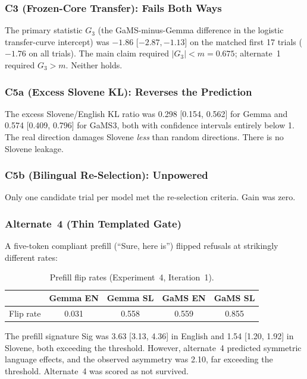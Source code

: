 \documentclass[11pt,letterpaper]{article}
\begin{document}
\subsubsection{C3 (Frozen-Core Transfer): Fails Both Ways}

The primary statistic $G_3$ (the GaMS-minus-Gemma difference in the logistic transfer-curve intercept) was $-1.86$ [$-2.87, -1.13$] on the matched first 17 trials ($-1.76$ on all trials). The main claim required $|G_3| < m = 0.675$; alternate~1 required $G_3 > m$. Neither holds.

\subsubsection{C5a (Excess Slovene KL): Reverses the Prediction}

The excess Slovene/English KL ratio was 0.298 [0.154, 0.562] for Gemma and 0.574 [0.409, 0.796] for GaMS3, both with confidence intervals entirely below 1. The real direction damages Slovene \emph{less} than random directions. There is no Slovene leakage.

\subsubsection{C5b (Bilingual Re-Selection): Unpowered}

Only one candidate trial per model met the re-selection criteria. Gain was zero.

\subsubsection{Alternate~4 (Thin Templated Gate)}

A five-token compliant prefill (``Sure, here is'') flipped refusals at strikingly different rates:

\begin{table}[!htbp]
\centering
\caption{Prefill flip rates (Experiment~4, Iteration~1).}
\label{tab:prefill_exp4}
\begin{tabular}{lcccc}
\toprule
 & Gemma EN & Gemma SL & GaMS EN & GaMS SL \\
\midrule
Flip rate & 0.031 & 0.558 & 0.559 & 0.855 \\
\bottomrule
\end{tabular}
\end{table}

The prefill signature Sig was 3.63 [3.13, 4.36] in English and 1.54 [1.20, 1.92] in Slovene, both exceeding the threshold. However, alternate~4 predicted symmetric language effects, and the observed asymmetry was 2.10, far exceeding the threshold. Alternate~4 was scored as not survived.
\end{document}
